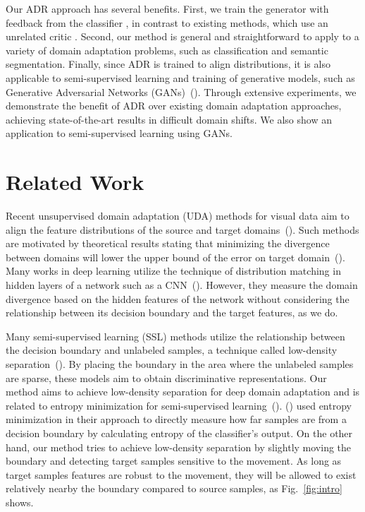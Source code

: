 \documentclass{article} \usepackage{iclr2018_conference,times}
\begin{document}
Our ADR approach has several benefits.
First, we train the generator  with feedback from the classifier , in contrast to existing methods, which use an unrelated critic .
Second, our method is general and straightforward to apply to a variety of domain adaptation problems, such as classification and semantic segmentation.
Finally, since ADR is trained to align distributions, it is also applicable to semi-supervised learning and training of generative models, such as Generative Adversarial Networks (GANs)~(\cite{goodfellow2014generative}). Through extensive experiments, we demonstrate the benefit of ADR over existing domain adaptation approaches, achieving state-of-the-art results in difficult domain shifts. We also show an application to semi-supervised learning using GANs.


\section{Related Work}\label{sec:related}
\vspace{-3mm}        

Recent unsupervised domain adaptation (UDA) methods for visual data aim to align the feature distributions of the source and target domains~(\cite{sun2016return,sun2016deep,tzeng2014deep,ganin2016domain,long2015learning,yan2017mind,long2016deep}). Such methods are motivated by theoretical results stating that minimizing the divergence between domains will lower the upper bound of the error on target domain~(\cite{ben2010theory}). 
Many works in deep learning utilize the technique of distribution matching in hidden layers of a network such as a CNN~(\cite{tzeng2014deep,ganin2016domain,long2015learning}). However, they measure the domain divergence based on the hidden features of the network without considering the relationship between its decision boundary and the target features, as we do.


 Many semi-supervised learning (SSL) methods utilize the relationship between the decision boundary and unlabeled samples, a technique called low-density separation~(\cite{chapelle2005semi,joachims1999transductive}). By placing the boundary in the area where the unlabeled samples are sparse, these models aim to obtain discriminative representations.
Our method aims to achieve low-density separation for deep domain adaptation and is related to entropy minimization for semi-supervised learning~(\cite{grandvalet2005semi}). (\cite{long2016unsupervised}) used entropy minimization in their approach to directly measure how far samples are from a decision boundary by calculating entropy of the classifier's output. On the other hand, our method tries to achieve low-density separation by slightly moving the boundary and detecting target samples sensitive to the movement. As long as target samples features are robust to the movement, they will be allowed to exist relatively nearby the boundary compared to source samples, as Fig.~\ref{fig:intro} shows. 
\end{document}
